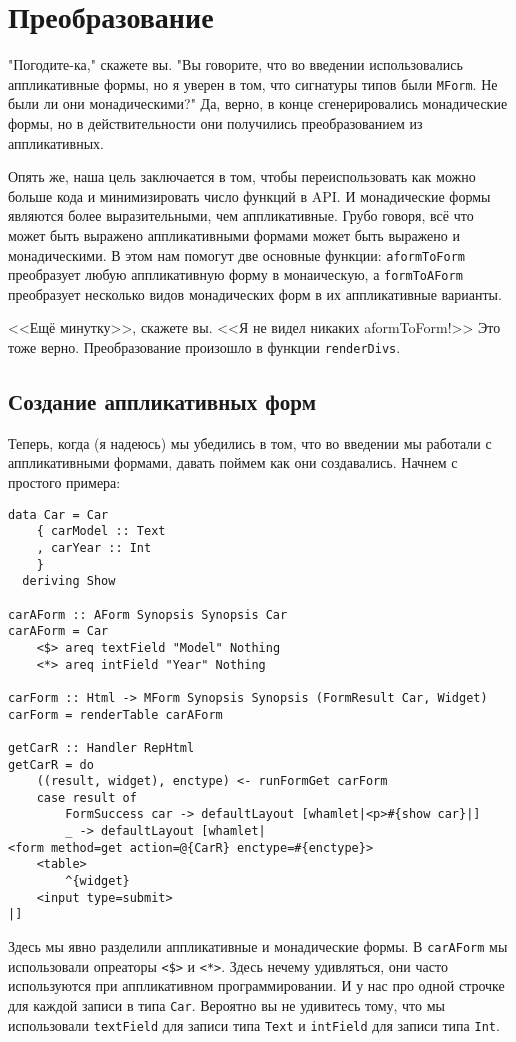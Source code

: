\section{Преобразование}

"Погодите-ка," скажете вы. "Вы говорите, что во введении использовались аппликативные
формы, но я уверен в том, что сигнатуры типов были \lstinline'MForm'. Не были ли
они монадическими?" Да, верно, в конце сгенерировались монадические формы, но в
действительности они получились преобразованием из аппликативных.

Опять же, наша цель заключается в том, чтобы переиспользовать как можно больше кода и
минимизировать число функций в API. И  монадические формы являются более
выразительными, чем аппликативные. Грубо говоря, всё что может быть выражено
аппликативными формами может быть выражено и монадическими. В этом нам помогут две
основные функции: \lstinline'aformToForm' преобразует любую аппликативную форму в
монаическую, а \lstinline'formToAForm' преобразует несколько видов монадических форм в их
аппликативные варианты.

<<Ещё минутку>>, скажете вы. <<Я не видел никаких aformToForm!>> Это тоже верно.
Преобразование произошло в функции \lstinline'renderDivs'.

\subsection{Создание аппликативных форм}
Теперь, когда (я надеюсь) мы убедились в том, что во введении мы работали с
аппликативными формами, давать поймем как они создавались. Начнем с простого примера:

\begin{lstlisting}
data Car = Car
    { carModel :: Text
    , carYear :: Int
    }
  deriving Show

carAForm :: AForm Synopsis Synopsis Car
carAForm = Car
    <$> areq textField "Model" Nothing
    <*> areq intField "Year" Nothing

carForm :: Html -> MForm Synopsis Synopsis (FormResult Car, Widget)
carForm = renderTable carAForm

getCarR :: Handler RepHtml
getCarR = do
    ((result, widget), enctype) <- runFormGet carForm
    case result of
        FormSuccess car -> defaultLayout [whamlet|<p>#{show car}|]
        _ -> defaultLayout [whamlet|
<form method=get action=@{CarR} enctype=#{enctype}>
    <table>
        ^{widget}
    <input type=submit>
|]
\end{lstlisting}
Здесь мы явно разделили аппликативные и монадические формы. В \lstinline'carAForm' мы
использовали опреаторы \lstinline'<$>' и \lstinline'<*>'. Здесь нечему удивляться, они
часто используются при аппликативном программировании. И у нас про одной строчке для
каждой записи в типа \lstinline'Car'. Вероятно вы не удивитесь тому, что мы использовали 
\lstinline'textField' для записи типа \lstinline'Text' и \lstinline'intField' для записи
типа \lstinline'Int'.

